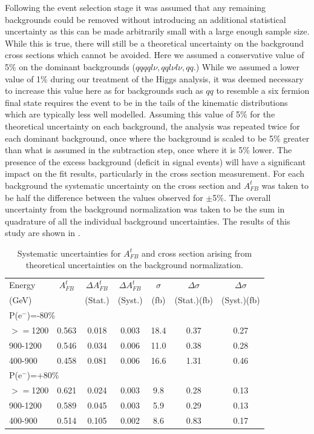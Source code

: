 Following the event selection stage it was assumed that any remaining backgrounds could be removed without introducing an additional statistical uncertainty as this can be made arbitrarily small with a large enough sample size. While this is true, there will still be a theoretical uncertainty on the background cross sections which cannot be avoided. Here we assumed a conservative value of 5\% on the dominant backgrounds ($qqqql\nu, qql\nu l\nu,qq$.) While we assumed a lower value of 1\% during our treatment of the Higgs analysis, it was deemed necessary to increase this value here as for backgrounds such as $qq$ to resemble a six fermion final state requires the event to be in the tails of the kinematic distributions which are typically less well modelled. Assuming this value of 5\% for the theoretical uncertainty on each background, the analysis was repeated twice for each dominant background, once where the background is scaled to be 5\% greater than what is assumed in the subtraction step, once where it is 5\% lower. The presence of the excess background (\/deficit in signal events) will have a significant impact on the fit results, particularly in the cross section measurement. For each background the systematic uncertainty on the cross section and $A_{FB}^t$ was taken to be half the difference between the values observed for $\pm$5\%. The overall uncertainty from the background normalization was taken to be the sum in quadrature of all the individual background uncertainties. The results of this study are shown in .

\begin{table}
  \centering
  \begin{tabular}{l|c|c|c|c|c|c}
    \toprule
     Energy & $A_{FB}^t$ & $\Delta A_{FB}^t$  & $\Delta A^t_{FB}$ &  $\sigma$  &  $\Delta\sigma$  &  $\Delta\sigma$ \\
     (GeV) &  & (Stat.) & (Syst.) &  (fb) &  (Stat.)(fb) &  (Syst.)(fb)\\
     \midrule
     \midrule
     \multicolumn{7}{l}{P(e$^-$)=-80\%} \\
     \midrule
     \midrule
    $>=$1200   & 0.563 & 0.018 & 0.003 & 18.4 & 0.37 & 0.27\\
    \midrule
    900-1200   & 0.546 & 0.034 & 0.006 & 11.0 & 0.38 & 0.28\\
    \midrule
    400-900    & 0.458 & 0.081 & 0.006 & 16.6 & 1.31 & 0.46\\
    \midrule
    \midrule
   \multicolumn{7}{l}{ P(e$^-$)=+80\%}\\
    \midrule
    \midrule
    $>=$1200  & 0.621 & 0.024 & 0.003 & 9.8 & 0.28 & 0.13 \\
    \midrule
    900-1200  & 0.589 & 0.045 & 0.003 & 5.9 & 0.29 & 0.13 \\
    \midrule
    400-900   & 0.514 & 0.105 & 0.002 & 8.6 & 0.83 & 0.17 \\
    \bottomrule
  \end{tabular}
  \caption{Systematic uncertainties for $A_{FB}^t$ and cross section arising from theoretical uncertainties on the background normalization.}
  \label{tab:bkgnorm}
\end{table}

